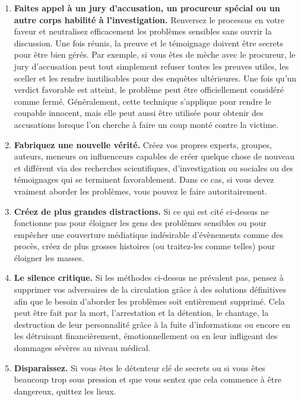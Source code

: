 \documentclass[11pt,twoside,a4paper]{article}
\begin{document}
\begin{enumerate}
	\item \textbf{Faites appel {\`a} un jury d'accusation, un procureur sp{\'e}cial ou un autre corps habilit{\'e} {\`a} l'investigation. } Renversez le processus en votre faveur et neutralisez efficacement les probl{\`e}mes sensibles sans ouvrir la discussion. Une fois r{\'e}unis, la preuve et le t{\'e}moignage doivent {\^e}tre secrets pour {\^e}tre bien g{\'e}r{\'e}s. Par exemple, si vous {\^e}tes de m{\`e}che avec le procureur, le jury d'accusation peut tout simplement refuser toutes les preuves utiles, les sceller et les rendre inutilisables pour des enqu{\^e}tes ult{\'e}rieures. Une fois qu'un verdict favorable est atteint, le probl{\`e}me peut {\^e}tre officiellement consid{\'e}r{\'e} comme ferm{\'e}. G{\'e}n{\'e}ralement, cette technique s'applique pour rendre le coupable innocent, mais elle peut aussi {\^e}tre utilis{\'e}e pour obtenir des accusations lorsque l'on cherche {\`a} faire un coup mont{\'e} contre la victime.
	\item \textbf{Fabriquez une nouvelle v{\'e}rit{\'e}. } Cr{\'e}ez vos propres experts, groupes, auteurs, meneurs ou influenceurs capables de cr{\'e}er quelque chose de nouveau et diff{\'e}rent via des recherches scientifiques, d'investigation ou sociales ou des t{\'e}moignages qui se terminent favorablement. Dans ce cas, si vous devez vraiment aborder les probl{\`e}mes, vous pouvez le faire autoritairement.
	\item \textbf{Cr{\'e}ez de plus grandes distractions. } Si ce qui est cit{\'e} ci-dessus ne fonctionne pas pour {\'e}loigner les gens des probl{\`e}mes sensibles ou pour emp{\^e}cher une couverture m{\'e}diatique ind{\'e}sirable d'{\'e}v{\`e}nements comme des proc{\`e}s, cr{\'e}ez de plus grosses histoires (ou traitez-les comme telles) pour {\'e}loigner les masses.
	\item \textbf{Le silence critique. } Si les m{\'e}thodes ci-dessus ne pr{\'e}valent pas, pensez {\`a} supprimer vos adversaires de la circulation gr{\^a}ce {\`a} des solutions d{\'e}finitives afin que le besoin d'aborder les probl{\`e}mes soit enti{\`e}rement supprim{\'e}. Cela peut {\^e}tre fait par la mort, l'arrestation et la d{\'e}tention, le chantage, la destruction de leur personnalit{\'e} gr{\^a}ce {\`a} la fuite d'informations ou encore en les d{\'e}truisant financi{\`e}rement, {\'e}motionnellement ou en leur infligeant des dommages s{\'e}v{\`e}res au niveau m{\'e}dical.
	\item \textbf{Disparaissez. } Si vous {\^e}tes le d{\'e}tenteur cl{\'e} de secrets ou si vous {\^e}tes beaucoup trop sous pression et que vous sentez que cela commence {\`a} {\^e}tre dangereux, quittez les lieux.
\end{enumerate}
\setlength\parindent{0pt}
\end{document}
